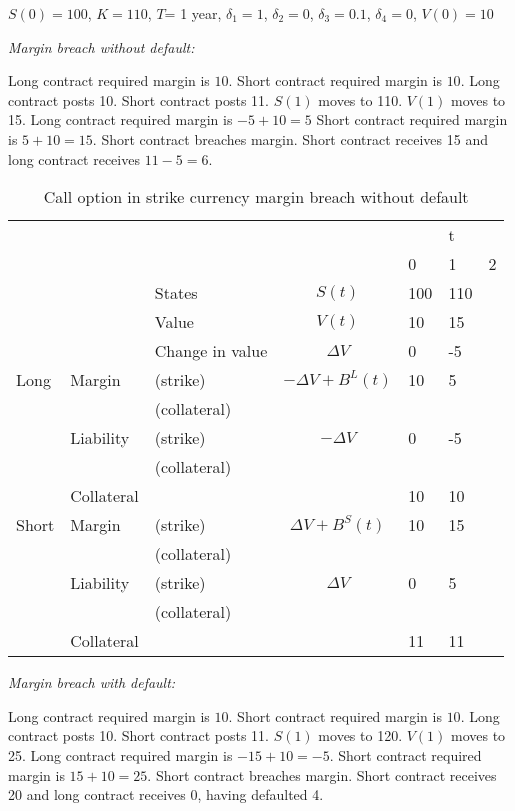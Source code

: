 \documentclass[12pt]{article}
\begin{document}
$S(0)=100$, $K=110$, $T$= 1 year, $\delta_1=1$, $\delta_2=0$, $\delta_3 =0.1$, $\delta_4=0$, $V(0)=10$


\textit{Margin breach without default:}

Long contract required margin is $10$. Short contract required margin is $10$. Long contract posts 10. Short contract posts 11. $S(1)$ moves to 110. $V(1)$ moves to 15. Long contract required margin is $-5 + 10=5$ Short contract required margin is $5 + 10 = 15$. Short contract breaches margin. Short contract receives 15 and long contract receives $11-5=6$.


\begin{table}
\begin{tabular}{lll|c|lll}
&  &  &  &  & t &\\  
&  &  &  & 0 & 1 & 2\\
\hline
\hline
&  & States &  $S(t)$ & 100 & 110 & \\
&  & Value  &  $V(t)$  & 10 & 15 &  \\
&  & Change in value & $\Delta V$ & 0& -5 &  \\
\hline
Long      & Margin    & (strike)     & $-\Delta V + B^L(t)$& 10 & 5 & \\
          &           & (collateral) & & & &\\ 
          & Liability & (strike)     & $-\Delta V$ & 0 & -5 & \\ 
          &           & (collateral)& & & &\\
          & Collateral&                       &    & 10 & 10 & \\
\hline          
Short     & Margin    & (strike)     & $\Delta V + B^S(t)$ & 10 & 15 & \\
          &           & (collateral) & & & &\\
          & Liability & (strike)     & $\Delta V$ & 0 & 5 &\\
          &           & (collateral) & & & &\\
          & Collateral&                       &    & 11 & 11 & \\ 
          

\end{tabular}
\caption{Call option in strike currency margin breach without default}
\label{fut}
\end{table}


\textit{Margin breach with default:}


Long contract required margin is $10$. Short contract required margin is $10$. Long contract posts 10. Short contract posts 11. $S(1)$ moves to 120. $V(1)$ moves to 25. Long contract required margin is $-15 + 10=-5$. Short contract required margin is $ 15+ 10 = 25$. Short contract breaches margin. Short contract receives 20 and long contract receives $0$, having defaulted 4.
\end{document}
